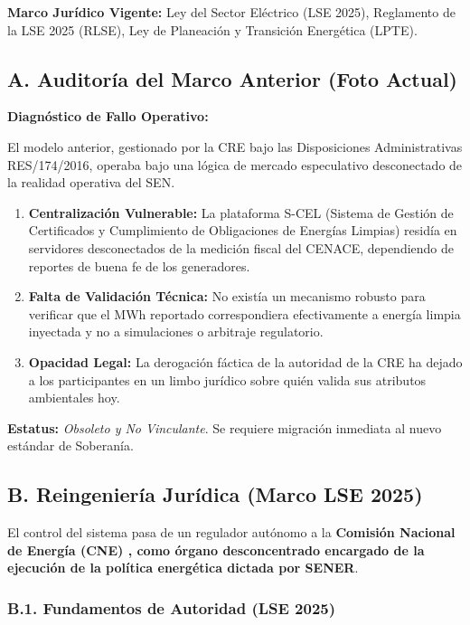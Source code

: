 \documentclass{cel}
\begin{document}
\textbf{Marco Jurídico Vigente:} Ley del Sector Eléctrico (LSE 2025), Reglamento de la LSE 2025 (RLSE), Ley de Planeación y Transición Energética (LPTE).


\subsection{A. Auditoría del Marco Anterior (\textquotedbl{}Foto Actual\textquotedbl{})}
\nopagebreak

\textbf{Diagnóstico de Fallo Operativo:}

El modelo anterior, gestionado por la CRE bajo las Disposiciones Administrativas RES/174/2016, operaba bajo una lógica de mercado especulativo desconectado de la realidad operativa del SEN.


\begin{enumerate}
\item \textbf{Centralización Vulnerable:} La plataforma S-CEL (Sistema de Gestión de Certificados y Cumplimiento de Obligaciones de Energías Limpias) residía en servidores desconectados de la medición fiscal del CENACE, dependiendo de reportes de \textquotedbl{}buena fe\textquotedbl{} de los generadores.
\item \textbf{Falta de Validación Técnica:} No existía un mecanismo robusto para verificar que el MWh reportado correspondiera efectivamente a energía limpia inyectada y no a simulaciones o arbitraje regulatorio.
\item \textbf{Opacidad Legal:} La derogación fáctica de la autoridad de la CRE ha dejado a los participantes en un limbo jurídico sobre quién valida sus atributos ambientales hoy.

\end{enumerate}
\textbf{Estatus:} \textit{Obsoleto y No Vinculante}. Se requiere migración inmediata al nuevo estándar de Soberanía.


\subsection{B. Reingeniería Jurídica (Marco LSE 2025)}
\nopagebreak

El control del sistema pasa de un regulador autónomo a la \textbf{Comisión Nacional de Energía (CNE) \textbf{, como órgano desconcentrado encargado de la ejecución de la política energética dictada por }SENER}.


\vspace{0.4cm}
\subsubsection{B.1. Fundamentos de Autoridad (LSE 2025)}
\nopagebreak
\end{document}
